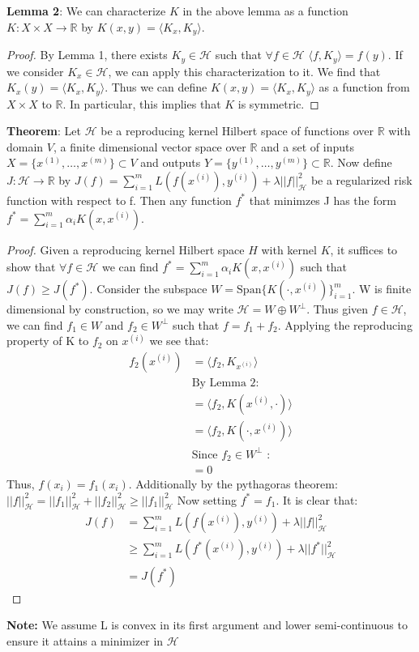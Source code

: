 \documentclass[12pt]{article}
\begin{document}
\textbf{Lemma 2}: We can characterize $K$ in the above lemma as a function $K: X \times X \to \mathbb{R}$ by $K(x, y) = \langle K_x, K_y \rangle$.
\begin{proof}
    By Lemma 1, there exists $K_y \in \mathcal{H}$ such that $\forall f \in \mathcal{H}$ $\langle f, K_y \rangle = f(y)$. If we consider $K_x \in \mathcal{H}$, 
    we can apply this characterization to it. We find that $K_x(y) = \langle K_x, K_y \rangle$. Thus we can define $K(x, y) = \langle K_x, K_y \rangle$ as a function
    from $X \times X$ to $\mathbb{R}$. In particular, this implies that $K$ is symmetric.
\end{proof}

\textbf{Theorem}: Let $\mathcal{H}$ be a reproducing kernel Hilbert space of functions over $\mathbb{R}$ with domain $V$, a finite dimensional vector space over $\mathbb{R}$
and a set of inputs $X = \{x^{(1)}, \ldots, x^{(m)}\} \subset V$ and outputs $Y = \{y^{(1)}, \ldots, y^{(m)}\} \subset \mathbb{R}$. Now define $J: \mathcal{H} \to \mathbb{R}$
by $J(f) = \displaystyle \sum_{i = 1}^m  L(f(x^{(i)}), y^{(i)}) + \lambda||f||^2_\mathcal{H}$ be a regularized risk function with respect to f. Then
any function $f^*$ that minimzes J has the form $f^* = \sum_{i = 1}^m \alpha_iK(x, x^{(i)})$.
\begin{proof}
Given a reproducing kernel Hilbert space $H$ with kernel $K$, it suffices to show that $\forall f \in \mathcal{H}$ we can find $f^* = \sum_{i = 1}^m \alpha_iK(x, x^{(i)})$
such that $J(f) \geq J(f^*)$. Consider the subspace $W = \text{Span}\{K(\cdot, x^{(i)})\}^m_{i=1}$. W is
finite dimensional by construction, so we may write $\mathcal{H} = W \oplus W^\perp$. Thus given $f \in \mathcal{H}$, we can find $f_1 \in W$ and
$f_2 \in W^\perp$ such that $f = f_1 + f_2$. Applying the reproducing property of K to $f_2$ on $x^{(i)}$ we see that:
\begin{align*}
    f_2(x^{(i)}) &= \langle f_2, K_{x^{(i)}} \rangle \\
    &\text{By Lemma 2:} \\
    &= \langle f_2, K(x^{(i)}, \cdot) \rangle \\
    &= \langle f_2, K(\cdot, x^{(i)}) \rangle \\
    &\text{Since $f_2 \in W^\perp$ :} \\
    &= 0
\end{align*}
Thus, $f(x_i) = f_1(x_i)$. Additionally by the pythagoras theorem: $||f||_\mathcal{H}^2 = ||f_1||_\mathcal{H}^2 + ||f_2||_\mathcal{H}^2 \geq ||f_1||_\mathcal{H}^2$
Now setting $f^* = f_1$. It is clear that:
\begin{align*}
    J(f) &= \displaystyle \sum_{i = 1}^m  L(f(x^{(i)}), y^{(i)}) + \lambda||f||^2_\mathcal{H} \\
    &\geq \displaystyle \sum_{i = 1}^m  L(f^*(x^{(i)}), y^{(i)}) + \lambda||f^*||^2_\mathcal{H} \\
    &= J(f^*)
\end{align*}
\end{proof}
\textbf{Note:} We assume L is convex in its first argument and lower semi-continuous to ensure it attains a minimizer in $\mathcal{H}$
\end{document}
